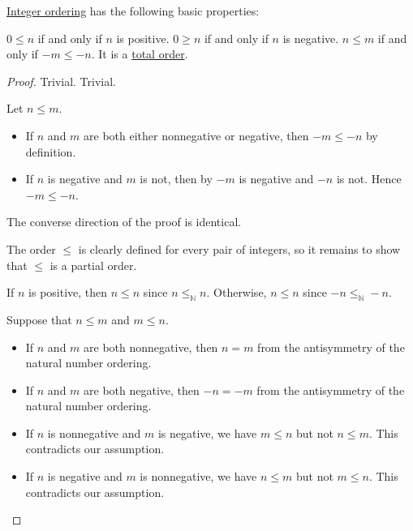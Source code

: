 \begin{proposition}\label{thm:def:integer_ordering}
  \hyperref[def:integer_ordering]{Integer ordering} has the following basic properties:
  \begin{thmenum}
     \( 0 \leq n \) if and only if \( n \) is positive.
     \( 0 \geq n \) if and only if \( n \) is negative.
     \( n \leq m \) if and only if \( -m \leq -n \).
     It is a \hyperref[def:totally_ordered_set]{total order}.
  \end{thmenum}
\end{proposition}
\begin{proof}
   Trivial.
   Trivial.

   Let \( n \leq m \).
  \begin{itemize}
    \item If \( n \) and \( m \) are both either nonnegative or negative, then \( -m \leq -n \) by definition.
    \item If \( n \) is negative and \( m \) is not, then by  \( -m \) is negative and \( -n \) is not. Hence \( -m \leq -n \).
  \end{itemize}

  The converse direction of the proof is identical.

   The order \( \leq \) is clearly defined for every pair of integers, so it remains to show that \( \leq \) is a partial order.

   If \( n \) is positive, then \( n \leq n \) since \( n \leq_\BbbN n \). Otherwise, \( n \leq n \) since \( -n \leq_\BbbN -n \).

   Suppose that \( n \leq m \) and \( m \leq n \).
  \begin{itemize}
    \item If \( n \) and \( m \) are both nonnegative, then \( n = m \) from the antisymmetry of the natural number ordering.
    \item If \( n \) and \( m \) are both negative, then \( -n = -m \) from the antisymmetry of the natural number ordering.
    \item If \( n \) is nonnegative and \( m \) is negative, we have \( m \leq n \) but not \( n \leq m \). This contradicts our assumption.
    \item If \( n \) is negative and \( m \) is nonnegative, we have \( n \leq m \) but not \( m \leq n \). This contradicts our assumption.
  \end{itemize}


\end{proof}

